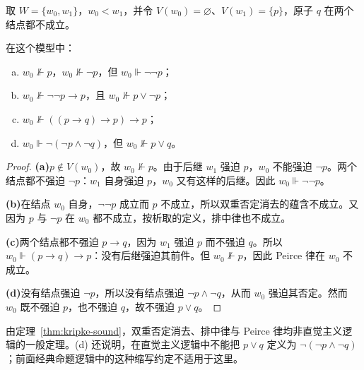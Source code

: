 \documentclass[lang=cn,a4paper,fontset=none,zihao=false,10pt,openany,twoside]{beautybook}
\numberwithin{algorithm}{chapter}
\begin{document}
\begin{readingmaterial}[title={阅读材料：Kripke 语义},title after break={阅读材料：Kripke 语义（续）}]
\begin{example}[两结点反模型]
取 $W=\{w_0,w_1\}$，$w_0<w_1$，并令 $V(w_0)=\varnothing$、$V(w_1)=\{p\}$，原子 $q$ 在两个结点都不成立。
\begin{center}
\end{center}
在这个模型中：
\begin{enumerate}[(a)]
\item $w_0\nVdash p$，$w_0\nVdash\neg p$，但 $w_0\Vdash\neg\neg p$；
\item $w_0\nVdash\neg\neg p\to p$，且 $w_0\nVdash p\vee\neg p$；
\item $w_0\nVdash((p\to q)\to p)\to p$；
\item $w_0\Vdash\neg(\neg p\wedge\neg q)$，但 $w_0\nVdash p\vee q$。
\end{enumerate}
\end{example}
\begin{proof}
\par\smallskip\noindent\textbf{(a)}\quad $p\notin V(w_0)$，故 $w_0\nVdash p$。由于后继 $w_1$ 强迫 $p$，$w_0$ 不能强迫 $\neg p$。两个结点都不强迫 $\neg p$：$w_1$ 自身强迫 $p$，$w_0$ 又有这样的后继。因此 $w_0\Vdash\neg\neg p$。

\par\smallskip\noindent\textbf{(b)}\quad 在结点 $w_0$ 自身，$\neg\neg p$ 成立而 $p$ 不成立，所以双重否定消去的蕴含不成立。又因为 $p$ 与 $\neg p$ 在 $w_0$ 都不成立，按析取的定义，排中律也不成立。

\par\smallskip\noindent\textbf{(c)}\quad 两个结点都不强迫 $p\to q$，因为 $w_1$ 强迫 $p$ 而不强迫 $q$。所以 $w_0\Vdash(p\to q)\to p$：没有后继强迫其前件。但 $w_0\nVdash p$，因此 Peirce 律在 $w_0$ 不成立。

\par\smallskip\noindent\textbf{(d)}\quad 没有结点强迫 $\neg p$，所以没有结点强迫 $\neg p\wedge\neg q$，从而 $w_0$ 强迫其否定。然而 $w_0$ 既不强迫 $p$，也不强迫 $q$，故不强迫 $p\vee q$。
\end{proof}
由定理~\ref{thm:kripke-sound}，双重否定消去、排中律与 Peirce 律均非直觉主义逻辑的一般定理。(d) 还说明，在直觉主义逻辑中不能把 $p\vee q$ 定义为 $\neg(\neg p\wedge\neg q)$；前面经典命题逻辑中的这种缩写约定不适用于这里。


\end{readingmaterial}
\end{document}
